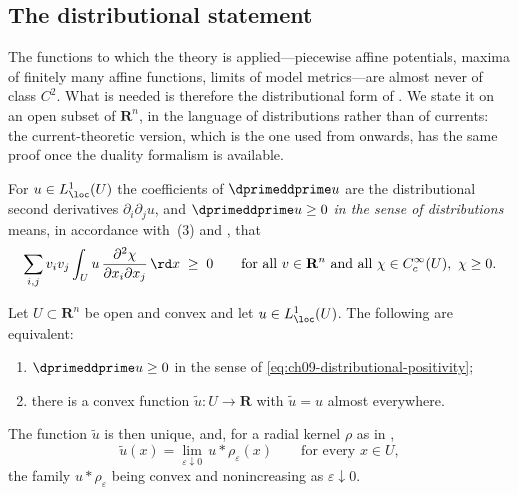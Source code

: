 \subsection{The distributional statement}

The functions to which the theory is applied---piecewise affine potentials,
maxima of finitely many affine functions, limits of model
metrics---are almost never of class $C^2$.  What is needed is therefore the
distributional form of .  We state it on an
open subset of $\mathbf R^n$, in the language of distributions rather than of
currents: the current-theoretic version, which is the one used from
 onwards, has the same proof once the duality
formalism is available.

For $u\in L^1_{\loc}(U)$ the coefficients of $\dprimeddprime u$ are the
distributional second derivatives $\partial_i\partial_ju$, and \emph{$\dprimeddprime u\geq0$
in the sense of distributions} means, in accordance with
\,(3) and
, that
\begin{equation}
\label{eq:ch09-distributional-positivity}
 \sum_{i,j}v_iv_j\int_Uu\,\frac{\partial^2\chi}{\partial x_i\partial x_j}
   \,\rd x\;\geq\;0
 \qquad\text{for all }v\in\mathbf R^n
 \text{ and all }\chi\in C_c^\infty(U),\ \chi\geq0 .
\end{equation}

\begin{theorem}
\label{thm:ch09-distributional-convexity}
Let $U\subset\mathbf R^n$ be open and convex and let $u\in L^1_{\loc}(U)$.
The following are equivalent:
\begin{enumerate}
\item $\dprimeddprime u\geq0$ in the sense of
  \eqref{eq:ch09-distributional-positivity};
\item there is a convex function $\tilde u:U\to\mathbf R$ with
  $\tilde u=u$ almost everywhere.
\end{enumerate}
The function $\tilde u$ is then unique, and, for a radial kernel $\rho$ as in
,
\[
 \tilde u(x)=\lim_{\varepsilon\downarrow0}\,u*\rho_\varepsilon(x)
 \qquad\text{for every }x\in U,
\]
the family $u*\rho_\varepsilon$ being convex and nonincreasing as
$\varepsilon\downarrow0$.
\end{theorem}

